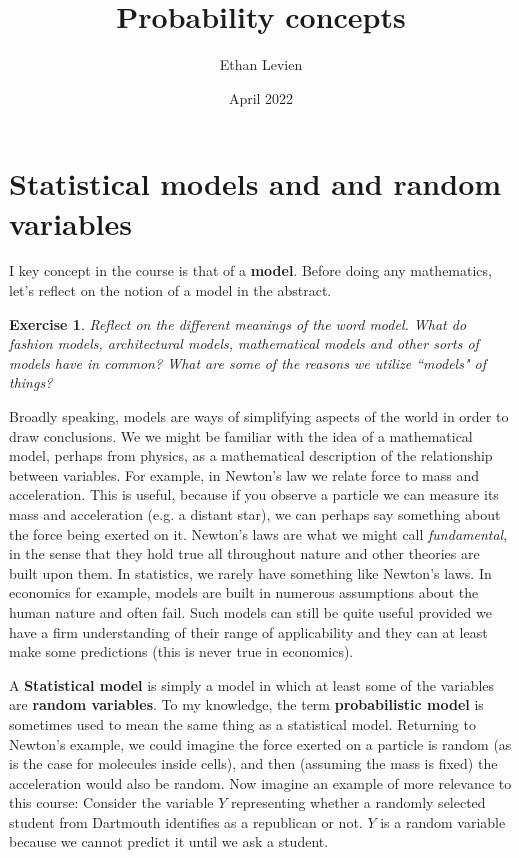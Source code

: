 \documentclass{amsart}
\title{Probability concepts}
\author{Ethan Levien}
\date{April 2022}
\newtheorem{exercise}{Exercise}
\begin{document}
\maketitle

\tableofcontents



\section{Statistical models and and random variables}
I key concept in the course is that of a {\bf model}. Before doing any mathematics, let's reflect on the notion of a model in the abstract. 

\begin{exercise}
Reflect on the different meanings of the word model. What do fashion models, architectural models, mathematical models and other sorts of models have in common?  What are some of the reasons we utilize ``models" of things? 
\end{exercise}

Broadly speaking, models are ways of simplifying aspects of the world in order to draw conclusions. We we might be familiar with the idea of a mathematical model, perhaps from physics, as a mathematical description of the relationship between variables. For example, in Newton's law we relate force to mass and acceleration. This is useful, because if you observe a particle we can measure its mass and acceleration (e.g. a distant star), we can perhaps say something about the force being exerted on it. Newton's laws are what we might call \emph{fundamental}, in the sense that they hold true all throughout nature and other theories are built upon them. In statistics, we rarely have something like Newton's laws. In economics for example, models are built in numerous assumptions about the human nature and often fail. Such models can still be quite useful provided we have a firm understanding of their range of applicability and they can at least make some predictions (this is never true in economics). 


A {\bf Statistical model} is simply a model in which at least some of the variables are {\bf random variables}. To my knowledge, the term {\bf probabilistic model} is sometimes used to mean the same thing as a statistical model.  Returning to Newton's example, we could imagine the force exerted on a particle is random (as is the case for molecules inside cells), and then (assuming the mass is fixed) the acceleration would also be random. Now imagine an example of more relevance to this course: Consider the variable $Y$ representing whether a randomly selected student from Dartmouth identifies as a republican or not. $Y$ is a random variable because we cannot predict it until we ask a student. 
\end{document}
